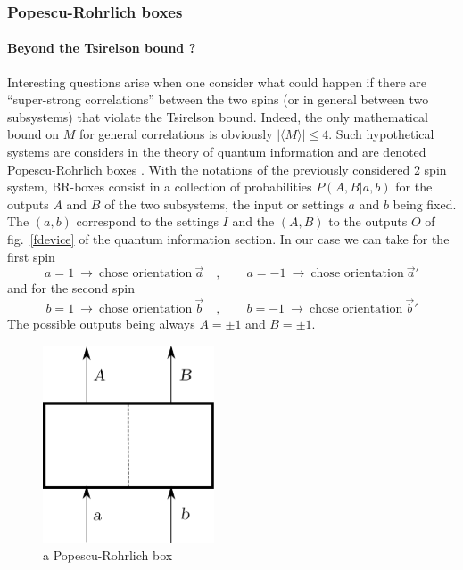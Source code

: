 \subsubsection{Popescu-Rohrlich boxes}
\paragraph{Beyond the Tsirelson bound ?}
Interesting questions arise when one consider what could happen if there are ``super-strong correlations'' between the two spins (or in general between two subsystems) that violate the Tsirelson bound.
Indeed, the only mathematical bound on $M$ for general correlations is obviously $|\langle M\rangle|\le 4$.
Such hypothetical systems are considers in the theory of quantum information and are denoted Popescu-Rohrlich boxes
\cite{springerlink:10.1007/BF02058098}
. 
With the notations of the previously considered 2 spin system, BR-boxes consist in a collection of probabilities $P(A,B|a,b)$
for the outputs $A$ and $B$ of the two subsystems, the input or settings $a$ and $b$ being fixed. 
The $(a,b)$ correspond to the settings $I$ and the $(A,B)$ to the outputs $O$ of fig.~\ref{fdevice} of the quantum information section.
In our case we can take for the first spin
\begin{equation}
\label{ }
a=1\ \to\ \text{chose orientation}\  \vec a\quad,\qquad
a=-1\ \to\ \text{chose orientation}\  \vec a'
\end{equation}
and for the second spin
\begin{equation}
\label{ }
b=1\ \to\ \text{chose orientation}\  \vec b\quad,\qquad
b=-1\ \to\ \text{chose orientation}\  \vec b'
\end{equation}
The possible outputs being always $A=\pm 1$ and $B=\pm 1$.


\begin{figure}[h]
\begin{center}
\includegraphics[width=2in]{PR-box.pdf}
\caption{a Popescu-Rohrlich box}
\label{fPRbox}
\end{center}
\end{figure}

